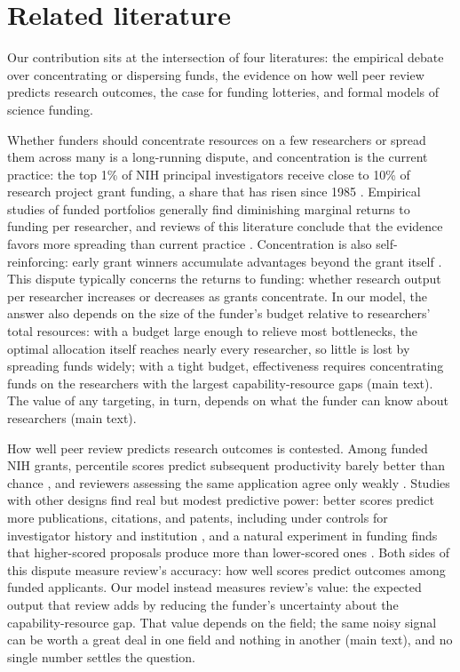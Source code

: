 \section{Related literature}\label{sec:literature}

Our contribution sits at the intersection of four literatures: the empirical debate over concentrating or dispersing funds, the evidence on how well peer review predicts research outcomes, the case for funding lotteries, and formal models of science funding.

Whether funders should concentrate resources on a few researchers or spread them across many is a long-running dispute, and concentration is the current practice: the top 1\% of NIH principal investigators receive close to 10\% of research project grant funding, a share that has risen since 1985 \citep{KatzMatter2020, Lauer2021}. Empirical studies of funded portfolios generally find diminishing marginal returns to funding per researcher, and reviews of this literature conclude that the evidence favors more spreading than current practice \citep{Mongeon2016, Aagaard2020}. Concentration is also self-reinforcing: early grant winners accumulate advantages beyond the grant itself \citep{BolVaanRijt2018}. This dispute typically concerns the returns to funding: whether research output per researcher increases or decreases as grants concentrate. In our model, the answer also depends on the size of the funder's budget relative to researchers' total resources: with a budget large enough to relieve most bottlenecks, the optimal allocation itself reaches nearly every researcher, so little is lost by spreading funds widely; with a tight budget, effectiveness requires concentrating funds on the researchers with the largest capability-resource gaps (main text). The value of any targeting, in turn, depends on what the funder can know about researchers (main text).

How well peer review predicts research outcomes is contested. Among funded NIH grants, percentile scores predict subsequent productivity barely better than chance \citep{Fang2016}, and reviewers assessing the same application agree only weakly \citep{Pier2018}. Studies with other designs find real but modest predictive power: better scores predict more publications, citations, and patents, including under controls for investigator history and institution \citep{LiAgha2015}, and a natural experiment in funding finds that higher-scored proposals produce more than lower-scored ones \citep{ParkLeeKim2015}. Both sides of this dispute measure review's accuracy: how well scores predict outcomes among funded applicants. Our model instead measures review's value: the expected output that review adds by reducing the funder's uncertainty about the capability-resource gap. That value depends on the field; the same noisy signal can be worth a great deal in one field and nothing in another (main text), and no single number settles the question.


